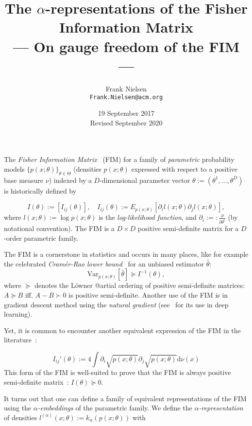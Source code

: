 \documentclass[11pt]{article}
\title{The $\alpha$-representations of the Fisher Information Matrix\\ --- On gauge freedom of the FIM ---}
\date{19 September 2017\\ Revised September 2020}
\author{Frank Nielsen\\ {\tt Frank.Nielsen@acm.org}}
\def\eqdef{:=}
\def\eqnota{:=:}
\def\dnu{\mathrm{d}\nu}
\def\Var{\mathrm{Var}}
\begin{document}
\maketitle



The {\em Fisher Information Matrix}~\cite{IG-2014} (FIM) for a family of {\em parametric} probability models $\{p(x;\theta)\}_{\theta\in\Theta}$ 
(densities $p(x;\theta)$ expressed with respect to a positive base measure $\nu$) indexed by
 a $D$-dimensional parameter vector $\theta\eqdef(\theta^1,\ldots,\theta^D)$  is historically defined by

\begin{equation}\label{eq:FIM1}
I(\theta) \eqdef [I_{ij}(\theta)],
\quad I_{ij}(\theta) \eqdef E_{p(x;\theta)}\left[\partial_i l(x;\theta)\partial_j l(x;\theta)\right],
\end{equation}
where $l(x;\theta)\eqdef\log p(x;\theta)$ is the {\em log-likelihood function}, and 
$\partial_i \eqnota \frac{\partial}{\partial\theta^i}$ (by notational convention).
The FIM is a $D\times D$ positive semi-definite matrix for a $D$-order parametric family.

The FIM  is a cornerstone in statistics and occurs in many places, like for example the celebrated
 {\em Cram\'er-Rao lower bound}~\cite{CR-2013} for an unbiased estimator $\hat\theta$:
$$
\Var_{p(x;\theta)}[\hat{\theta}]\succeq I^{-1}(\theta),
$$
where $\succeq$ denotes the L\"owner @artial ordering of positive semi-definite matrices: 
$A\succeq B$  iff. $A-B\succ 0$ is  positive semi-definite.
Another use of the FIM is in gradient descent method using the {\em natural gradient} (see~\cite{RFIM-2017}  for its use in deep learning).

Yet, it is common to encounter another equivalent expression of the FIM in the literature~\cite{CR-2013,IG-2014}:

\begin{equation}\label{eq:FIM0}
I_{ij}'(\theta) \eqdef 4\int \partial_i\sqrt{p(x;\theta)}\partial_j\sqrt{p(x;\theta)}\dnu(x)
\end{equation}
This form of the FIM is well-suited to prove that the FIM is always positive semi-definite matrix~\cite{IG-2014}: $I(\theta)\succeq 0$.



It turns out that one can define a family of equivalent representations of the FIM using the {\em $\alpha$-embeddings} of the parametric family.
We define the {\em $\alpha$-representation} of densities $l^{(\alpha)}(x;\theta):=k_\alpha(p(x;\theta))$ with
\end{document}
